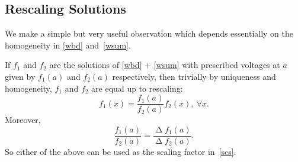 \documentclass[a4paper]{amsart}
\theoremstyle{plain}
\theoremstyle{definition}
\theoremstyle{remark}
\DeclareMathOperator{\lap}{\Delta}
\begin{document}
\subsection{Rescaling Solutions} \label{rescale} We make a simple but very useful observation which depends essentially on the homogeneity in \eqref{wbd} and~\eqref{wsum}.

If $ f_1 $ and $ f_2 $ are the solutions of 
\eqref{wbd} + \eqref{wsum} with prescribed voltages at $ a $ given by $ f_1(a) $ and $ f_2(a) $ respectively, then trivially by uniqueness and homogeneity, $ f_1 $ and $ f_2 $  are equal up to rescaling:
\begin{equation} \label{scs}
f_1(x) = \frac{f_1(a)}{f_2(a)}f_2(x), \ \forall x .
\end{equation} 
Moreover, 
\begin{equation} \label{lapfr}
 \frac{f_1(a)}{f_2(a)}  =  \frac{\lap f_1(a)}{\lap f_2(a)} .
\end{equation}
So either of the above can be used as the scaling factor in~\eqref{scs}.


\end{document}
